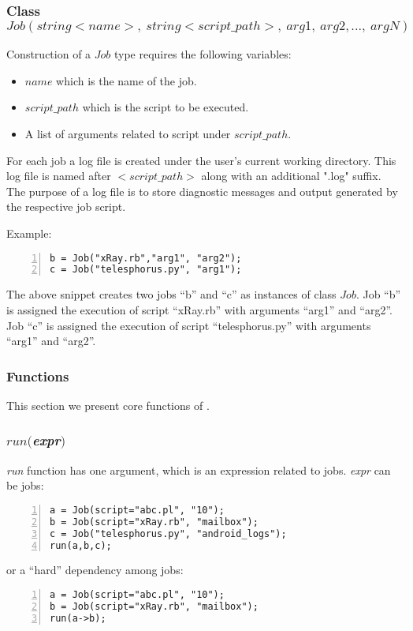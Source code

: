 \subsubsection*{Class $Job(string <name>,~ string <script\_path>,~arg1,~arg2, ...,~argN)$}
Construction of a $Job$ type requires the following variables:
\begin{itemize}
\item $name$ which is the name of the job.
\item $script\_path$ which is the script to be executed.
\item A list of arguments related to script under $script\_path$.\\
\end{itemize}
For each \lang{} job a log file is created under the user's current working
directory. This
log file is named after $<script\_path>$ along with an additional ".log" suffix. The purpose
of a log file is to store diagnostic messages and output generated by the respective job script.

Example:
\begin{Verbatim}[numbers=left]
b = Job("xRay.rb","arg1", "arg2");
c = Job("telesphorus.py", "arg1");
\end{Verbatim}

The above snippet creates two jobs ``b'' and ``c'' as instances of class $Job$.
Job ``b'' is assigned the execution of script ``xRay.rb'' with arguments ``arg1'' and ``arg2''.
Job ``c'' is assigned the execution of script ``telesphorus.py'' with arguments ``arg1'' and ``arg2''.


\subsubsection*{\lang{} Functions}

This section we present core functions of \lang{}.
\subsubsection*{$run($\textit{expr}$)$}
\textit{run} function has one argument, which is an expression related to jobs.
\textit{expr} can be jobs:
\begin{Verbatim}[numbers=left]
a = Job(script="abc.pl", "10");
b = Job(script="xRay.rb", "mailbox");
c = Job("telesphorus.py", "android_logs");
run(a,b,c);
\end{Verbatim}

or a ``hard'' dependency among jobs:
\begin{Verbatim}[numbers=left]
a = Job(script="abc.pl", "10");
b = Job(script="xRay.rb", "mailbox");
run(a->b);
\end{Verbatim}
